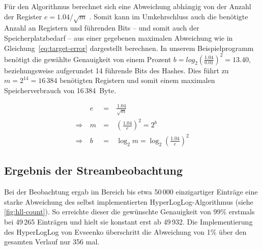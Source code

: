 
Für den Algorithmus berechnet sich eine Abweichung abhängig von der Anzahl der Register $e=1.04/\sqrt{m}$ \cite{flajolet2007}.
Somit kann im Umkehrschluss auch die benötigte Anzahl an Registern und führenden Bits -- und somit auch der Speicherplatzbedarf -- aus einer gegebenen maximalen Abweichung wie in Gleichung~\eqref{eq:target-error} dargestellt berechnen.
In unserem Beispielprogramm benötigt die gewählte Genauigkeit von einem Prozent $b = log_2 (\frac{1.04}{0.01})^2 = 13.40$, beziehungsweise aufgerundet 14 führende Bits des Hashes.
Dies führt zu $m = 2^{14} = 16\,384$ benötigten Registern und somit einem maximalen Speicherverbrauch von 16\,384~Byte.

\begin{equation}
	\begin{alignedat}{2}
		& e & \: = \: & \frac{1.04}{\sqrt{m}} \\
		\Rightarrow \: & m & \: = \: & \left(\frac{1.04}{e}\right)^2 = 2^b \\
		\Rightarrow \: & b & \: = \: & \log_2 m = \log_2 \left(\frac{1.04}{e}\right)^2
	\end{alignedat}
	\label{eq:target-error}
\end{equation}

\subsection{Ergebnis der Streambeobachtung}

Bei der Beobachtung ergab im Bereich bis etwa 50\,000 einzigartiger Einträge eine starke Abweichung des selbst implementierten HyperLogLog-Algorithmus (siehe \autoref{fig:hll-count}).
So erreichte dieser die gewünschte Genauigkeit von 99\% erstmals bei 49\,265 Einträgen und hielt sie konstant erst ab 49\,932.
Die Implementierung des HyperLogLog von Evseenko \cite{evseenko2018} überschritt die Abweichung von 1\% über den gesamten Verlauf nur 356 mal.

